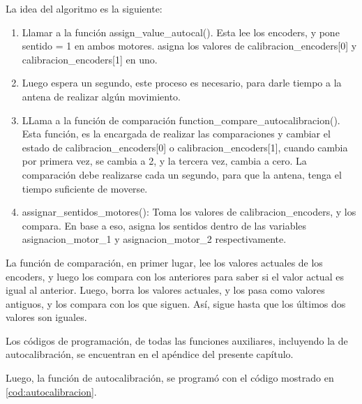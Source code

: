 La idea del algoritmo es la siguiente: 
\begin{enumerate}
	\item Llamar a la función assign\_value\_autocal(). Esta lee los encoders, y pone sentido = 1 en ambos motores. asigna los valores de calibracion\_encoders[0] y  calibracion\_encoders[1] en uno.  
	\item Luego espera un segundo, este proceso es necesario, para darle tiempo a la antena de realizar algún movimiento. 
	\item LLama a la función de comparación function\_compare\_autocalibracion(). Esta función, es la encargada de realizar las comparaciones y cambiar el estado de calibracion\_encoders[0] o calibracion\_encoders[1], cuando cambia por primera vez, se cambia a 2, y la tercera vez, cambia a cero. La comparación debe realizarse cada un segundo, para que la antena, tenga el tiempo suficiente de moverse.  
	\item assignar\_sentidos\_motores(): Toma los valores de calibracion\_encoders, y los compara. En base a eso, asigna los sentidos dentro de las variables asignacion\_motor\_1 y asignacion\_motor\_2 respectivamente. 
\end{enumerate}


La función de comparación, en primer lugar, lee los valores actuales de los encoders, y luego los compara con los anteriores para saber si el valor actual es igual al anterior. Luego, borra los valores actuales, y los pasa como valores antiguos, y los compara con los que siguen. Así, sigue hasta que los últimos dos valores son iguales.

Los códigos de programación, de todas las funciones auxiliares, incluyendo la de autocalibración, se encuentran en el apéndice del presente capítulo. 

Luego, la función de autocalibración, se programó con el código mostrado en \ref{cod:autocalibracion}. 


